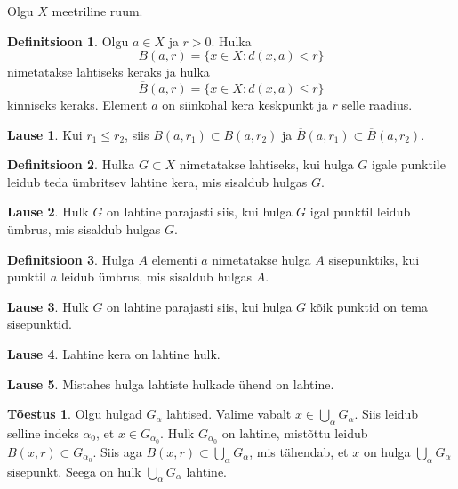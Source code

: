 \documentclass{article}[12pt]
\theoremstyle{definition}
\newtheorem{definition}{Definitsioon}[section]
\theoremstyle{definition}
\theoremstyle{definition}
\newtheorem{lause}{Lause}[section]
\theoremstyle{break}
\newtheorem*{toestus}{Tõestus}
\begin{document}
Olgu $X$ meetriline ruum.

\begin{definition}
	Olgu $a\in X$ ja $r>0$. Hulka
	\[
		B(a,r) = \{ x\in X: d(x,a) < r \}
	\]
	nimetatakse lahtiseks keraks ja hulka
	\[
		\overline{B}(a,r) = \{ x\in X: d(x,a) \leq r \}
	\]
	kinniseks keraks.
	Element $a$ on siinkohal kera keskpunkt ja $r$ selle raadius.
\end{definition}

\begin{lause}
	Kui $r_1\leq r_2$, siis $B(a,r_1)\subset B(a,r_2)$ ja $\overline{B}(a,r_1)\subset \overline{B}(a,r_2)$.
\end{lause}

\begin{definition}
	Hulka $G\subset X$ nimetatakse lahtiseks, kui hulga $G$ igale punktile leidub teda ümbritsev lahtine kera, mis sisaldub hulgas $G$.
\end{definition}

\begin{lause}
	Hulk $G$ on lahtine parajasti siis, kui hulga $G$ igal punktil leidub ümbrus, mis sisaldub hulgas $G$.
\end{lause}

\begin{definition}
	Hulga $A$ elementi $a$ nimetatakse hulga $A$ sisepunktiks, kui punktil $a$ leidub ümbrus, mis sisaldub hulgas $A$.
\end{definition}

\begin{lause}
	Hulk $G$ on lahtine parajasti siis, kui hulga $G$ kõik punktid on tema sisepunktid.
\end{lause}

\begin{lause}
	Lahtine kera on lahtine hulk.
\end{lause}

\begin{lause}
	Mistahes hulga lahtiste hulkade ühend on lahtine.
\end{lause}
\begin{toestus}
	Olgu hulgad $G_\alpha$ lahtised.
	Valime vabalt $x\in \bigcup_\alpha G_\alpha$.
	Siis leidub selline indeks $\alpha_0$, et $x\in G_{\alpha_0}$.
	Hulk $G_{\alpha_0}$ on lahtine, mistõttu leidub $B(x,r)\subset G_{\alpha_0}$.
	Siis aga $B(x,r)\subset \bigcup_\alpha G_{\alpha}$, mis tähendab, et $x$ on hulga $\bigcup_\alpha G_\alpha$ sisepunkt.
	Seega on hulk $\bigcup_\alpha G_\alpha$ lahtine.
\end{toestus}
\end{document}
